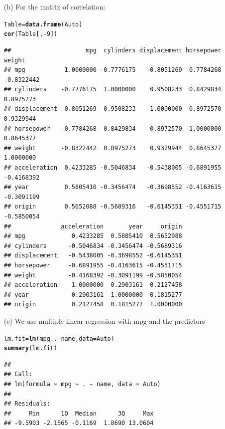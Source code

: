 \documentclass[a4paper, 10pt]{scrartcl}\usepackage[]{graphicx}\usepackage[]{color}
\makeatletter
\newcommand{\hlnum}[1]{\textcolor[rgb]{0.686,0.059,0.569}{#1}}%
\newcommand{\hlopt}[1]{\textcolor[rgb]{0,0,0}{#1}}%
\newcommand{\hlstd}[1]{\textcolor[rgb]{0.345,0.345,0.345}{#1}}%
\newcommand{\hlkwb}[1]{\textcolor[rgb]{0.69,0.353,0.396}{#1}}%
\newcommand{\hlkwc}[1]{\textcolor[rgb]{0.333,0.667,0.333}{#1}}%
\newcommand{\hlkwd}[1]{\textcolor[rgb]{0.737,0.353,0.396}{\textbf{#1}}}%
\newenvironment{kframe}{%
 \def\at@end@of@kframe{}%
 \ifinner\ifhmode%
  \def\at@end@of@kframe{\end{minipage}}%
  \begin{minipage}{\columnwidth}%
 \fi\fi%
 \def\FrameCommand##1{\hskip\@totalleftmargin \hskip-\fboxsep
 \colorbox{shadecolor}{##1}\hskip-\fboxsep
     \hskip-\linewidth \hskip-\@totalleftmargin \hskip\columnwidth}%
 \MakeFramed {\advance\hsize-\width
   \@totalleftmargin\z@ \linewidth\hsize
   \@setminipage}}%
 {\par\unskip\endMakeFramed%
 \at@end@of@kframe}
\newenvironment{knitrout}{}{} %
\makeatother
\begin{document}
\begin{itemize}
\begin{knitrout}
\end{knitrout}
	\item[(b)] For the matrix of correlation:
\begin{knitrout}
\color{fgcolor}\begin{kframe}
\begin{alltt}
\hlstd{Table} \hlkwb{=} \hlkwd{data.frame}\hlstd{(Auto)}
\hlkwd{cor}\hlstd{(Table[,} \hlopt{-}\hlnum{9}\hlstd{])}
\end{alltt}
\begin{verbatim}
##                     mpg  cylinders displacement horsepower     weight
## mpg           1.0000000 -0.7776175   -0.8051269 -0.7784268 -0.8322442
## cylinders    -0.7776175  1.0000000    0.9508233  0.8429834  0.8975273
## displacement -0.8051269  0.9508233    1.0000000  0.8972570  0.9329944
## horsepower   -0.7784268  0.8429834    0.8972570  1.0000000  0.8645377
## weight       -0.8322442  0.8975273    0.9329944  0.8645377  1.0000000
## acceleration  0.4233285 -0.5046834   -0.5438005 -0.6891955 -0.4168392
## year          0.5805410 -0.3456474   -0.3698552 -0.4163615 -0.3091199
## origin        0.5652088 -0.5689316   -0.6145351 -0.4551715 -0.5850054
##              acceleration       year     origin
## mpg             0.4233285  0.5805410  0.5652088
## cylinders      -0.5046834 -0.3456474 -0.5689316
## displacement   -0.5438005 -0.3698552 -0.6145351
## horsepower     -0.6891955 -0.4163615 -0.4551715
## weight         -0.4168392 -0.3091199 -0.5850054
## acceleration    1.0000000  0.2903161  0.2127458
## year            0.2903161  1.0000000  0.1815277
## origin          0.2127458  0.1815277  1.0000000
\end{verbatim}
\end{kframe}
\end{knitrout}
	\item[(c)]We use multiple linear regression with mpg and the 
		predictors
\begin{knitrout}
\color{fgcolor}\begin{kframe}
\begin{alltt}
\hlstd{lm.fit} \hlkwb{=} \hlkwd{lm}\hlstd{(mpg}\hlopt{~}\hlstd{.}\hlopt{-}\hlstd{name,} \hlkwc{data}\hlstd{=Auto)}
\hlkwd{summary}\hlstd{(lm.fit)}
\end{alltt}
\begin{verbatim}
## 
## Call:
## lm(formula = mpg ~ . - name, data = Auto)
## 
## Residuals:
##     Min      1Q  Median      3Q     Max 
## -9.5903 -2.1565 -0.1169  1.8690 13.0604 

\end{verbatim}
\end{kframe}
\end{knitrout}
\end{itemize}
\end{document}
